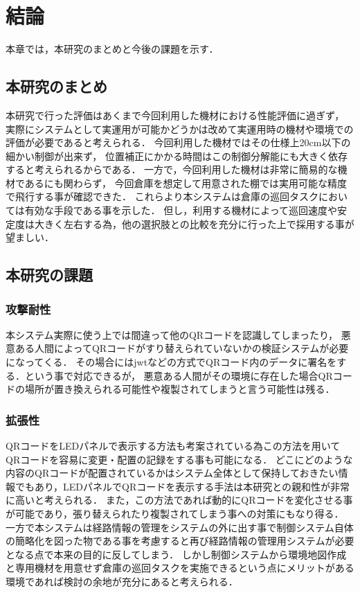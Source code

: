 \chapter{結論}
\label{conclusion}

本章では，本研究のまとめと今後の課題を示す．

\section{本研究のまとめ}
本研究で行った評価はあくまで今回利用した機材における性能評価に過ぎず，
実際にシステムとして実運用が可能かどうかは改めて実運用時の機材や環境での評価が必要であると考えられる．
今回利用した機材ではその仕様上20cm以下の細かい制御が出来ず，
位置補正にかかる時間はこの制御分解能にも大きく依存すると考えられるからである．
一方で，今回利用した機材は非常に簡易的な機材であるにも関わらず，
今回倉庫を想定して用意された棚では実用可能な精度で飛行する事が確認できた．
これらより本システムは倉庫の巡回タスクにおいては有効な手段である事を示した．
但し，利用する機材によって巡回速度や安定度は大きく左右する為，他の選択肢との比較を充分に行った上で採用する事が望ましい．


\section{本研究の課題}
\subsection{攻撃耐性}
本システム実際に使う上では間違って他のQRコードを認識してしまったり，
悪意ある人間によってQRコードがすり替えられていないかの検証システムが必要になってくる．
その場合にはjwtなどの方式でQRコード内のデータに署名をする．という事で対応できるが，
悪意ある人間がその環境に存在した場合QRコードの場所が置き換えられる可能性や複製されてしまうと言う可能性は残る．

\subsection{拡張性}
QRコードをLEDパネルで表示する方法\cite{led_qr}も考案されている為この方法を用いてQRコードを容易に変更・配置の記録をする事も可能になる．
どこにどのような内容のQRコードが配置されているかはシステム全体として保持しておきたい情報でもあり，LEDパネルでQRコードを表示する手法は本研究との親和性が非常に高いと考えられる．
また，この方法であれば動的にQRコードを変化させる事が可能であり，張り替えられたり複製されてしまう事への対策にもなり得る．
一方で本システムは経路情報の管理をシステムの外に出す事で制御システム自体の簡略化を図った物である事を考慮すると再び経路情報の管理用システムが必要となる点で本来の目的に反してしまう．
しかし制御システムから環境地図作成と専用機材を用意せず倉庫の巡回タスクを実施できるという点にメリットがある環境であれば検討の余地が充分にあると考えられる．


